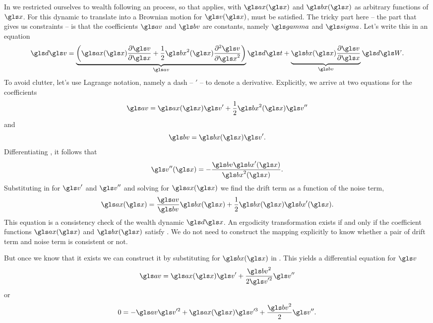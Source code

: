 In  we restricted ourselves to wealth following an \Ito process, 
so that  applies, with $\ax(\x)$ and $\bx(\x)$ as arbitrary functions of $\x$. 
For this dynamic to translate into a Brownian motion for $\gv(\x)$, 
must be satisfied. The tricky part here -- the part that gives us constraints --
is that the coefficients $\av$ and $\bv$ are constants, namely $\ggamma$ and $\gsigma$. 
Let's write this in an equation
\begin{equation}
\gd\gv = \underbrace{\left(\ax(\x) \frac{\partial \gv}{\partial \x} + \frac{1}{2}\bx^2(\x)\frac{\partial^2 \gv}{\partial \x^2}\right)}_{\av}\gd\t + \underbrace{\bx(\x) \frac{\partial \gv}{\partial \x}}_{\bv} \gd\gW.
\elabel{du_2}
\end{equation}
To avoid clutter, let's use 
Lagrange notation, namely a dash  -- $'$ -- to denote a derivative. 
Explicitly, we arrive at two equations for the coefficients  
\begin{equation}
\av=\ax(\x) \gv' + \frac{1}{2} \bx^2(\x) \gv''
\elabel{A}
\end{equation}
and
\begin{equation}
\bv=\bx(\x) \gv'.
\elabel{b_u}
\end{equation}
Differentiating , it follows that 
\begin{equation}
\gv''(\x)=-\frac{\bv \bx'(\x)}{\bx^2(\x)}.
\end{equation}
Substituting in  for $\gv'$ and $\gv''$ and solving for $\ax(\x)$ we
find the drift term as a function of the noise term,
\begin{equation}
\ax(\x) =\frac{\av}{\bv}\bx(\x)+ \frac{1}{2}\bx(\x)\bx'(\x).
\elabel{consistency}
\end{equation}
This equation is a consistency check of the wealth dynamic $\gd\x$. An ergodicity transformation exists 
if and only if the coefficient functions $\ax(\x)$ and $\bx(\x)$ satisfy .
We do not need to construct the mapping 
explicitly to know whether a pair of drift term and noise term is consistent or not. 

But once we know that it exists we can construct it by substituting for $\bx(\x)$ in . 
This yields  a differential equation for $\gv$
\begin{equation}
\av=\ax(\x) \gv' + \frac{\bv^2}{2\gv'^2}  \gv''
\end{equation}
or
\begin{equation}
0=-\av \gv'^2+ \ax(\x) \gv'^3 + \frac{\bv^2}{2}  \gv''.
\end{equation}

